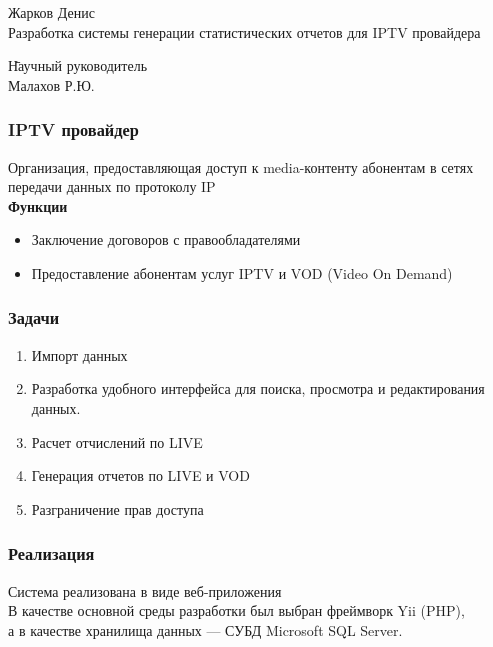 \documentclass{beamer}
\begin{document}
\sloppy

\begin{frame}
\begin{center}
Жарков Денис\\
\vspace{1cm}
{\Large Разработка системы генерации статистических отчетов для IPTV провайдера}
\end{center}
\begin{tabbing}
\hspace{6.5cm} \= Научный руководитель\\
\> Малахов Р.Ю.\\
\end{tabbing}
\end{frame}

\begin{frame}
\frametitle{IPTV провайдер}
Организация, предоставляющая доступ к media-контенту абонентам в сетях передачи данных по протоколу IP
\\
\vspace{0.3cm}
{\bf Функции}
\begin{itemize}
\item{
Заключение договоров с правообладателями
}
\item{
Предоставление абонентам услуг IPTV и VOD (Video On Demand)
}
\end{itemize}
\end{frame}

\begin{frame}
\frametitle{Задачи}
\begin{enumerate}
\item {
Импорт данных
}
\item {
Разработка удобного интерфейса для поиска, просмотра и редактирования данных.
}
\item {
Расчет отчислений по LIVE
}
\item {
Генерация отчетов по LIVE и VOD
}
\item {
Разграничение прав доступа
}
\end{enumerate}
\end{frame}

\begin{frame}
\frametitle{Реализация}

Система реализована в виде веб-приложения\\
В качестве основной среды разработки был выбран фреймворк Yii (PHP),\\
а в качестве хранилища данных --- СУБД Microsoft SQL Server.\\

\end{frame}
\end{document}
